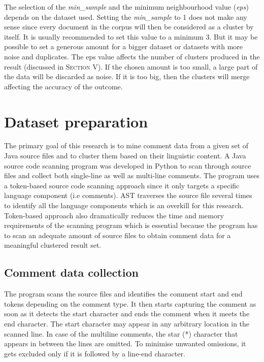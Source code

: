 \documentclass[conference]{IEEEtran}
\begin{document}
The selection of the \textit{min\_sample} and the minimum neighbourhood value (\textit{eps}) depends on the dataset used. Setting the \textit{min\_sample} to 1 does not make any sense since every document in the corpus will then be considered as a cluster by itself. It is usually recommended to set this value to a minimum 3. But it may be possible to set a generous amount for a bigger dataset or datasets with more noise and duplicates.  The eps value affects the number of clusters produced in the result (discussed in \textsc{Section V}). If the chosen amount is too small, a large part of the data will be discarded as noise. If it is too big, then the clusters will merge affecting the accuracy of the outcome.

\section{Dataset preparation}

The primary goal of this research is to mine comment data from a given set of Java source files and to cluster them based on their linguistic content. A Java source code scanning program was developed in Python to scan through source files and collect both single-line as well as multi-line comments. The program uses a token-based source code scanning approach since it only targets a specific language component (i.e comments). AST traverses the source file several times to identify all the language components which is an overkill for this research. Token-based approach also dramatically reduces the time and memory requirements of the scanning program \cite{4023995} which is essential because the program has to scan an adequate amount of source files to obtain comment data for a meaningful clustered result set.

\subsection{Comment data collection}

The program scans the source files and identifies the comment start and end tokens depending on the comment type. It then starts capturing the comment as soon as it detects the start character and ends the comment when it meets the end character. The start character may appear in any arbitrary location in the scanned line. In case of the multiline comments, the star (*) character that appears in between the lines are omitted. To minimise unwanted omissions, it gets excluded only if it is followed by a line-end character. 
\end{document}
